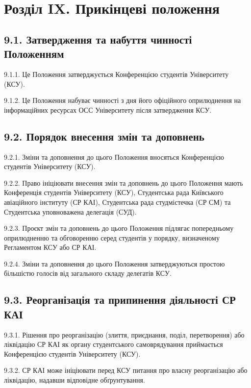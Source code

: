 \section*{Розділ IX. Прикінцеві положення}

\subsection*{9.1. Затвердження та набуття чинності Положенням}
    9.1.1. Це Положення затверджується Конференцією студентів Університету (КСУ).

    9.1.2. Це Положення набуває чинності з дня його офіційного оприлюднення на інформаційних ресурсах ОСС Університету після затвердження КСУ.

\subsection*{9.2. Порядок внесення змін та доповнень}
    9.2.1. Зміни та доповнення до цього Положення вносяться Конференцією студентів Університету (КСУ).

    9.2.2. Право ініціювати внесення змін та доповнень до цього Положення мають Конференція студентів Університету (КСУ), Студентська рада Київського авіаційного інституту (СР КАІ), Студентська рада студмістечка (СР СМ) та Студентська уповноважена делегація (СУД).

    9.2.3. Проєкт змін та доповнень до цього Положення підлягає попередньому оприлюдненню та обговоренню серед студентів у порядку, визначеному Регламентом КСУ або СР КАІ.

    9.2.4. Зміни та доповнення до цього Положення затверджуються простою більшістю голосів від загального складу делегатів КСУ.

\subsection*{9.3. Реорганізація та припинення діяльності СР КАІ}
    9.3.1. Рішення про реорганізацію (злиття, приєднання, поділ, перетворення) або ліквідацію СР КАІ як органу студентського самоврядування приймається Конференцією студентів Університету (КСУ).

    9.3.2. СР КАІ може ініціювати перед КСУ питання про власну реорганізацію або ліквідацію, надавши відповідне обґрунтування.

